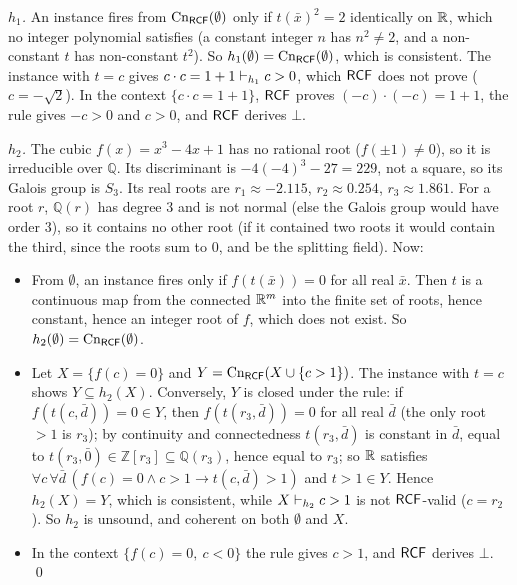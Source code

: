 \emph{$h_1$.} An instance fires from $\mathrm{Cn}_{\mathsf{RCF}}(\emptyset)$ only if $t(\bar x)^2=2$ identically on $\mathbb{R}$, which no integer polynomial satisfies (a constant integer $n$ has $n^2\neq2$, and a non-constant $t$ has non-constant $t^2$). So $h_1(\emptyset)=\mathrm{Cn}_{\mathsf{RCF}}(\emptyset)$, which is consistent. The instance with $t=c$ gives $c\cdot c=1+1\vdash_{h_1}c>0$, which $\mathsf{RCF}$ does not prove ($c=-\sqrt2$). In the context $\{c\cdot c=1+1\}$, $\mathsf{RCF}$ proves $(-c)\cdot(-c)=1+1$, the rule gives $-c>0$ and $c>0$, and $\mathsf{RCF}$ derives $\bot$.

\emph{$h_2$.} The cubic $f(x)=x^3-4x+1$ has no rational root ($f(\pm1)\neq0$), so it is irreducible over $\mathbb Q$. Its discriminant is $-4(-4)^3-27=229$, not a square, so its Galois group is $S_3$. Its real roots are $r_1\approx-2.115$, $r_2\approx0.254$, $r_3\approx1.861$. For a root $r$, $\mathbb Q(r)$ has degree $3$ and is not normal (else the Galois group would have order $3$), so it contains no other root (if it contained two roots it would contain the third, since the roots sum to $0$, and be the splitting field). Now:
\begin{itemize}[leftmargin=*]
\item From $\emptyset$, an instance fires only if $f(t(\bar x))=0$ for all real $\bar x$. Then $t$ is a continuous map from the connected $\mathbb{R}^m$ into the finite set of roots, hence constant, hence an integer root of $f$, which does not exist. So $h_2(\emptyset)=\mathrm{Cn}_{\mathsf{RCF}}(\emptyset)$.
\item Let $X=\{f(c)=0\}$ and $Y=\mathrm{Cn}_{\mathsf{RCF}}(X\cup\{c>1\})$. The instance with $t=c$ shows $Y\subseteq h_2(X)$. Conversely, $Y$ is closed under the rule: if $f(t(c,\bar d))=0\in Y$, then $f(t(r_3,\bar d))=0$ for all real $\bar d$ (the only root $>1$ is $r_3$); by continuity and connectedness $t(r_3,\bar d)$ is constant in $\bar d$, equal to $t(r_3,\bar0)\in\mathbb Z[r_3]\subseteq\mathbb Q(r_3)$, hence equal to $r_3$; so $\mathbb{R}$ satisfies $\forall c\,\forall\bar d\,(f(c)=0\wedge c>1\to t(c,\bar d)>1)$ and $t>1\in Y$. Hence $h_2(X)=Y$, which is consistent, while $X\vdash_{h_2}c>1$ is not $\mathsf{RCF}$-valid ($c=r_2$). So $h_2$ is unsound, and coherent on both $\emptyset$ and $X$.
\item In the context $\{f(c)=0,\ c<0\}$ the rule gives $c>1$, and $\mathsf{RCF}$ derives $\bot$. \qed
\end{itemize}

